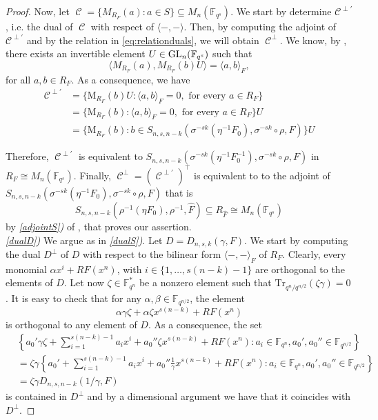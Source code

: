 \documentclass[10pt,a4paper]{amsart}
\DeclareMathOperator{\C}{\mathcal{C}}
\newcommand{\F}{{\mathbb F}}
\newcommand{\GL}{\hbox{{\rm GL}}}
\newcommand{\M}{\mathrm{M}}
\newcommand{\Tr}{{\mathrm{Tr}}}
\begin{document}
\begin{proof}
Now, let 
\(
\C=\{M_{R_F}(a) \colon a \in S\} \subseteq M_n(\F_{q^s}).
\)
We start by determine $\mathcal{C}^{\perp'}$, i.e. the dual of $\C$ with respect of $\langle -, - \rangle$. Then, by computing the adjoint of $\mathcal{C}^{\perp'}$ and by the relation in \eqref{eq:relationduals}, we will obtain $\C^{\perp}$. We know, by , there exists an invertible element $U \in \GL_n(\F_{q^s})$ such that 
\[
\langle M_{R_F}(a), M_{R_F}(b) U  \rangle= \langle a,b \rangle_F,
\]
for all \(a,b \in R_F\). As a consequence, we have
\[
\begin{split}
\C^{\perp'} &= \{\M_{R_F}(b)U: \langle a,b   \rangle_F=0, \mbox{ for every }a \in R_F\} \\
&= \{\M_{R_F}(b): \langle a,b  \rangle_F=0, \mbox{ for every } a \in R_F\}U \\
&= \{\M_{R_F}(b): b \in S_{n,s,n-k}(\sigma^{-sk}(\eta^{-1}F_0), \sigma^{-sk} \circ \rho,F) \}U
\end{split}
\]

Therefore, $\C^{\perp'}$ is equivalent to $S_{n,s,n-k}(\sigma^{-sk}(\eta^{-1}F_0^{-1}), \sigma^{-sk} \circ \rho,F)$ in $R_F \cong M_n(\F_{q^s})$. Finally, $\C^{\perp}=(\C^{\perp'})^{\top}$ is equivalent to to the adjoint of $S_{n,s,n-k}(\sigma^{-sk}(\eta^{-1}F_0), \sigma^{-sk} \circ \rho,F)$ that is
\[
S_{n,s,n-k}(\rho^{-1}(\eta F_0),  \rho^{-1},\hat{F}) \subseteq R_{\hat{F}} \cong M_n(\F_{q^s})
\]
by \emph{\ref{adjointS})} of , that proves our assertion. \\
\emph{\ref{dualD})} We argue as in \emph{\ref{dualS})}. Let $D=D_{n,s,k}(\gamma,F)$. We start by computing the dual $D^{\perp}$ of $D$ with respect to the bilinear form $\langle -,- \rangle_F$ of $R_F$. 
Clearly, every monomial $\alpha x^i+RF(x^n)$, with $i \in \{1,\ldots,s(n-k)-1\}$ are orthogonal to the elements of $D$. Let now $\zeta \in \F_{q^n}^*$ be a nonzero element such that $\Tr_{q^n/q^{n/2}}(\zeta \gamma)=0$. It is easy to check that for any $\alpha,\beta \in \F_{q^{n/2}}$, the element \[\alpha \gamma \zeta +\alpha \zeta x^{s(n-k)}+RF(x^n)\] is orthogonal to any element of $D$.
As a consequence, the set \[
\begin{split}
&\left\{a_0'\gamma \zeta+\sum\limits_{i=1}^{s(n-k)-1}a_ix^i+a_0''\zeta x^{s(n-k)}+RF(x^n) \colon a_i \in \F_{q^n},a_0',a_0'' \in \F_{q^{n/2}} \right\} \\
&= \zeta \gamma \left\{a_0'+\sum\limits_{i=1}^{s(n-k)-1}a_ix^i+a_0''\frac{1}{\gamma} x^{s(n-k)} + RF(x^n) \colon a_i \in \F_{q^n},a_0',a_0'' \in \F_{q^{n/2}} \right\} \\
&= \zeta \gamma D_{n,s,n-k}(1/\gamma,F)
\end{split}
\]
is contained in $D^{\perp}$ and by a dimensional argument we have that it coincides with $D^{\perp}$.


\end{proof}
\end{document}

